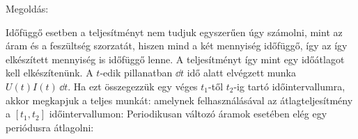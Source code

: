 
\ifdefined\megoldas

 Megoldás: 

 Időfüggő esetben a teljesítményt nem tudjuk egyszerűen úgy számolni, mint az áram és a feszültség szorzatát, hiszen mind a két mennyiség időfüggő, így az így elkészített mennyiség is időfüggő lenne. A teljesítményt így mint egy időátlagot kell elkészítenünk. A $t$-edik pillanatban $\dd t$ idő alatt elvégzett munka $U(t)I(t)\,\dd t$. Ha ezt összegezzük egy véges $t_1$-től $t_2$-ig tartó időintervallumra, akkor megkapjuk a teljes munkát:
 amelynek felhasználásával az átlagteljesítmény a $[t_1,t_2]$ időintervallumon:
 Periodikusan változó áramok esetében elég egy periódusra átlagolni:

